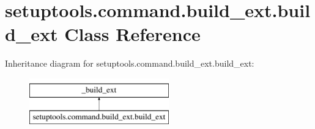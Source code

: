\hypertarget{classsetuptools_1_1command_1_1build__ext_1_1build__ext}{}\section{setuptools.\+command.\+build\+\_\+ext.\+build\+\_\+ext Class Reference}
\label{classsetuptools_1_1command_1_1build__ext_1_1build__ext}
Inheritance diagram for setuptools.\+command.\+build\+\_\+ext.\+build\+\_\+ext\+:\begin{figure}[H]
\begin{center}
\leavevmode
\includegraphics[height=2.000000cm]{classsetuptools_1_1command_1_1build__ext_1_1build__ext}
\end{center}
\end{figure}
